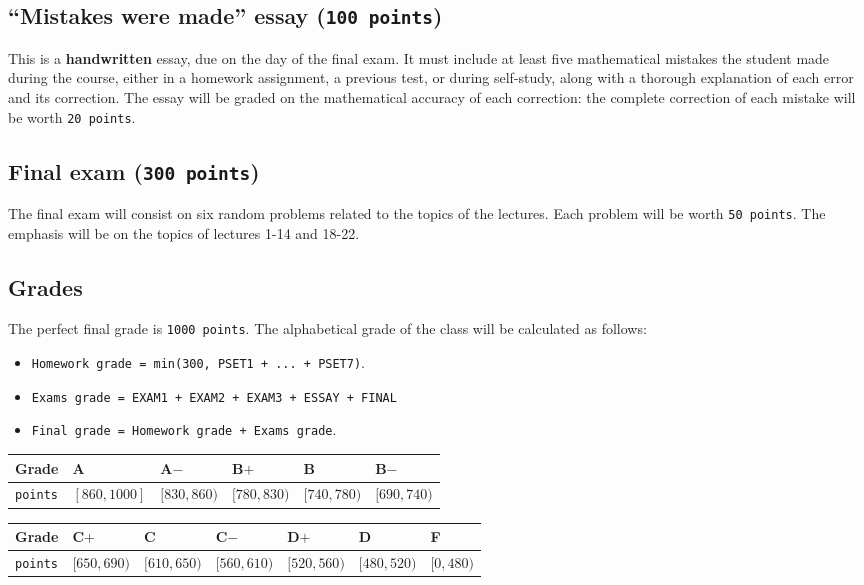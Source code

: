 \documentclass[11pt]{article}
\begin{document}
\subsection{``Mistakes were made'' essay (\texttt{100 points})}
\label{sec:org8cb0a5b}
This is a \textbf{handwritten} essay, due on the day of the final exam. It must include
at least five mathematical mistakes the student made during the course, either
in a homework assignment, a previous test, or during self-study, along with a
thorough explanation of each error and its correction. The essay will be graded
on the mathematical accuracy of each correction: the complete correction of
each mistake will be worth \texttt{20 points}.

\subsection{Final exam (\texttt{300 points})}
\label{sec:orga8f3e7a}
The final exam will consist on six random problems related to the topics of the
lectures. Each problem will be worth \texttt{50 points}. The emphasis will be on the
topics of lectures 1-14 and 18-22.

\subsection{Grades}
\label{sec:orgcbd460e}
The perfect final grade is \texttt{1000 points}. The alphabetical grade of the class
will be calculated as follows:
\begin{itemize}
\item \texttt{Homework grade = min(300, PSET1 + ... + PSET7)}.
\item \texttt{Exams grade = EXAM1 + EXAM2 + EXAM3 + ESSAY + FINAL}
\item \texttt{Final grade = Homework grade + Exams grade}.
\end{itemize}
\begin{center}
\begin{tabular}{l|lllll}
\textbf{Grade} & A & A\(-\) & B\(+\) & B & B\(-\)\\[0pt]
\hline
\texttt{points} & \([860,1000]\) & \([830,860)\) & \([780,830)\) & \([740,780)\) & \([690,740)\)\\[0pt]
\end{tabular}
\end{center}


\begin{center}
\begin{tabular}{l|llllll}
\textbf{Grade} & C\(+\) & C & C\(-\) & D\(+\) & D & F\\[0pt]
\hline
\texttt{points} & \([650,690)\) & \([610,650)\) & \([560,610)\) & \([520,560)\) & \([480,520)\) & \([0,480)\)\\[0pt]
\end{tabular}
\end{center}
\end{document}

